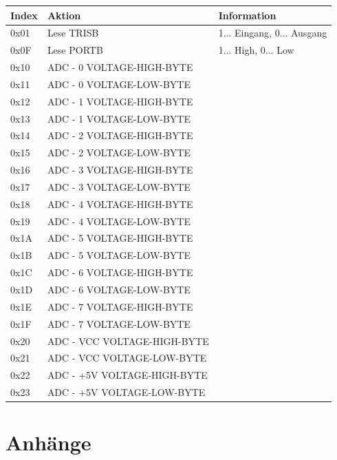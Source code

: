 \documentclass[a4paper,10pt]{article}
\begin{document}
\begin{center}
    \begin{tabular}{| l | l | l |}
    \hline
    Index 	& Aktion 			& Information \\ \hline
    0x01 	& Lese TRISB 			& 1... Eingang, 0... Ausgang \\ \hline
    0x0F 	& Lese PORTB 			& 1... High, 0... Low \\ \hline
    0x10 	& ADC - 0 VOLTAGE-HIGH-BYTE 	& \\ \hline
    0x11 	& ADC - 0 VOLTAGE-LOW-BYTE 	& \\ \hline
    0x12 	& ADC - 1 VOLTAGE-HIGH-BYTE 	& \\ \hline
    0x13 	& ADC - 1 VOLTAGE-LOW-BYTE 	& \\ \hline
    0x14 	& ADC - 2 VOLTAGE-HIGH-BYTE 	& \\ \hline
    0x15 	& ADC - 2 VOLTAGE-LOW-BYTE 	& \\ \hline
    0x16 	& ADC - 3 VOLTAGE-HIGH-BYTE 	& \\ \hline
    0x17 	& ADC - 3 VOLTAGE-LOW-BYTE 	& \\ \hline
    0x18 	& ADC - 4 VOLTAGE-HIGH-BYTE 	& \\ \hline
    0x19 	& ADC - 4 VOLTAGE-LOW-BYTE 	& \\ \hline
    0x1A 	& ADC - 5 VOLTAGE-HIGH-BYTE 	& \\ \hline
    0x1B 	& ADC - 5 VOLTAGE-LOW-BYTE 	& \\ \hline
    0x1C 	& ADC - 6 VOLTAGE-HIGH-BYTE 	& \\ \hline
    0x1D 	& ADC - 6 VOLTAGE-LOW-BYTE 	& \\ \hline
    0x1E 	& ADC - 7 VOLTAGE-HIGH-BYTE 	& \\ \hline
    0x1F 	& ADC - 7 VOLTAGE-LOW-BYTE 	& \\ \hline
    0x20 	& ADC - VCC VOLTAGE-HIGH-BYTE 	& \\ \hline
    0x21 	& ADC - VCC VOLTAGE-LOW-BYTE 	& \\ \hline
    0x22 	& ADC - +5V VOLTAGE-HIGH-BYTE 	& \\ \hline
    0x23 	& ADC - +5V VOLTAGE-LOW-BYTE 	& \\ \hline
    \end{tabular}
\end{center}

\newpage
\section{Anhänge}
\end{document}
